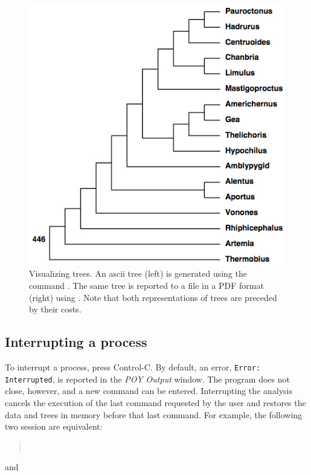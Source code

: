 {\begin{figure}
\begin{minipage}[c]{0.5\textwidth}
	   	\includegraphics[width=\textwidth]{doc/figures/pstree.jpg}
   	\end{minipage}
\caption{Visualizing trees. An ascii tree (left) is generated using the command
. The same tree is reported to a file in a PDF format (right) using . Note that both representations of trees  are preceded by their costs.}
\label{fig:trees}
\end{figure}

\subsection{Interrupting a process}
To interrupt a process, press Control-C. By default, an error, \texttt{Error:}\\ \texttt{Interrupted}, is reported in the \emph{POY Output} window. The program does not close, however, and a new command can be entered. Interrupting the analysis cancels the execution of the last command requested by the user and restores the data and trees in memory before that last command. For example, the following two session are equivalent: 

\begin{quote}
 	 \\
\end{quote}
and

}
